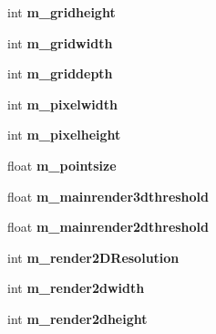 \begin{DoxyCompactItemize}
\item 
\hypertarget{classWorld_a75317dfa26c389097ec33eaaeec8fb4c}{int {\bfseries m\-\_\-gridheight}}\label{classWorld_a75317dfa26c389097ec33eaaeec8fb4c}

\item 
\hypertarget{classWorld_ae607046130457c6d74a882071a6255ef}{int {\bfseries m\-\_\-gridwidth}}\label{classWorld_ae607046130457c6d74a882071a6255ef}

\item 
\hypertarget{classWorld_acce2c6f4c4d7841dd2464a9b01b54d8a}{int {\bfseries m\-\_\-griddepth}}\label{classWorld_acce2c6f4c4d7841dd2464a9b01b54d8a}

\item 
\hypertarget{classWorld_a3aca11a629a5f7c0a994bcd125abbb01}{int {\bfseries m\-\_\-pixelwidth}}\label{classWorld_a3aca11a629a5f7c0a994bcd125abbb01}

\item 
\hypertarget{classWorld_ad073f66d707ed8b628de22baf34f2653}{int {\bfseries m\-\_\-pixelheight}}\label{classWorld_ad073f66d707ed8b628de22baf34f2653}

\item 
\hypertarget{classWorld_a6f4ecaeca3e48d93a562702aa25b25bb}{float {\bfseries m\-\_\-pointsize}}\label{classWorld_a6f4ecaeca3e48d93a562702aa25b25bb}

\item 
\hypertarget{classWorld_a8a4a12d65982956fd609587857288c93}{float {\bfseries m\-\_\-mainrender3dthreshold}}\label{classWorld_a8a4a12d65982956fd609587857288c93}

\item 
\hypertarget{classWorld_a73ff711f99e69ef8a56034867350e324}{float {\bfseries m\-\_\-mainrender2dthreshold}}\label{classWorld_a73ff711f99e69ef8a56034867350e324}

\item 
\hypertarget{classWorld_a6e26cd343dc738b135b8a9717358fd89}{int {\bfseries m\-\_\-render2\-D\-Resolution}}\label{classWorld_a6e26cd343dc738b135b8a9717358fd89}

\item 
\hypertarget{classWorld_a3fc863ab1f8f43fb4273d019d9eb13d7}{int {\bfseries m\-\_\-render2dwidth}}\label{classWorld_a3fc863ab1f8f43fb4273d019d9eb13d7}

\item 
\hypertarget{classWorld_a432b07c10f25465df847b320d3230b0b}{int {\bfseries m\-\_\-render2dheight}}\label{classWorld_a432b07c10f25465df847b320d3230b0b}


\end{DoxyCompactItemize}
